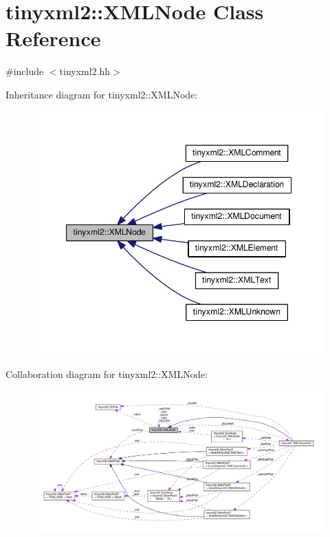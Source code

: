\hypertarget{classtinyxml2_1_1XMLNode}{}\section{tinyxml2\+:\+:X\+M\+L\+Node Class Reference}
\label{classtinyxml2_1_1XMLNode}


{\ttfamily \#include $<$tinyxml2.\+hh$>$}



Inheritance diagram for tinyxml2\+:\+:X\+M\+L\+Node\+:
\nopagebreak
\begin{figure}[H]
\begin{center}
\leavevmode
\includegraphics[width=348pt]{classtinyxml2_1_1XMLNode__inherit__graph}
\end{center}
\end{figure}


Collaboration diagram for tinyxml2\+:\+:X\+M\+L\+Node\+:
\nopagebreak
\begin{figure}[H]
\begin{center}
\leavevmode
\includegraphics[width=350pt]{classtinyxml2_1_1XMLNode__coll__graph}
\end{center}
\end{figure}
